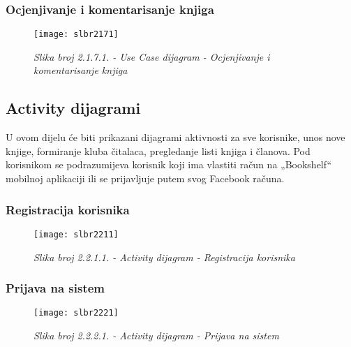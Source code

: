 \documentclass[a4paper oneside ,12pt]{article}
\begin{document}
\subsubsection{Ocjenjivanje i komentarisanje knjiga}
\begin{center}
\begin{figure}[H] 
\begin{center}
\texttt{[image: slbr2171]}
\caption*{\textit{Slika broj 2.1.7.1. - Use Case dijagram - Ocjenjivanje i komentarisanje knjiga}}
\end{center}
\end{figure}
\end{center}

\newpage
\subsection{Activity dijagrami}
U ovom dijelu će biti prikazani dijagrami aktivnosti za sve korisnike, unos nove knjige, formiranje kluba čitalaca, pregledanje listi knjiga i članova. Pod korisnikom se podrazumijeva korisnik koji ima vlastiti račun na „Bookshelf“ mobilnoj aplikaciji ili se prijavljuje putem svog Facebook računa. \par

\subsubsection{Registracija korisnika }
\begin{center}
\begin{figure}[H] 
\begin{center}
\texttt{[image: slbr2211]}
\caption*{\textit{Slika broj 2.2.1.1. - Activity dijagram - Registracija korisnika}}
\end{center}
\end{figure}
\end{center}

\subsubsection{Prijava na sistem }
\begin{center}
\begin{figure}[H] 
\begin{center}
\texttt{[image: slbr2221]}
\caption*{\textit{Slika broj 2.2.2.1. - Activity dijagram - Prijava na sistem}}
\end{center}
\end{figure}
\end{center}
\end{document}
